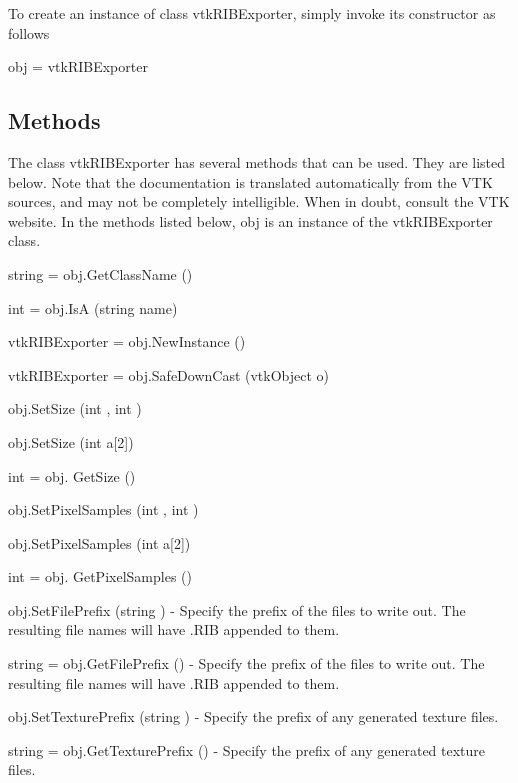 To create an instance of class vtk\-R\-I\-B\-Exporter, simply invoke its constructor as follows \begin{DoxyVerb}  obj = vtkRIBExporter
\end{DoxyVerb}
 \hypertarget{vtkwidgets_vtkxyplotwidget_Methods}{}\subsection{Methods}\label{vtkwidgets_vtkxyplotwidget_Methods}
The class vtk\-R\-I\-B\-Exporter has several methods that can be used. They are listed below. Note that the documentation is translated automatically from the V\-T\-K sources, and may not be completely intelligible. When in doubt, consult the V\-T\-K website. In the methods listed below, {\ttfamily obj} is an instance of the vtk\-R\-I\-B\-Exporter class. 
\begin{DoxyItemize}
\item {\ttfamily string = obj.\-Get\-Class\-Name ()}  
\item {\ttfamily int = obj.\-Is\-A (string name)}  
\item {\ttfamily vtk\-R\-I\-B\-Exporter = obj.\-New\-Instance ()}  
\item {\ttfamily vtk\-R\-I\-B\-Exporter = obj.\-Safe\-Down\-Cast (vtk\-Object o)}  
\item {\ttfamily obj.\-Set\-Size (int , int )}  
\item {\ttfamily obj.\-Set\-Size (int a\mbox{[}2\mbox{]})}  
\item {\ttfamily int = obj. Get\-Size ()}  
\item {\ttfamily obj.\-Set\-Pixel\-Samples (int , int )}  
\item {\ttfamily obj.\-Set\-Pixel\-Samples (int a\mbox{[}2\mbox{]})}  
\item {\ttfamily int = obj. Get\-Pixel\-Samples ()}  
\item {\ttfamily obj.\-Set\-File\-Prefix (string )} -\/ Specify the prefix of the files to write out. The resulting file names will have .R\-I\-B appended to them.  
\item {\ttfamily string = obj.\-Get\-File\-Prefix ()} -\/ Specify the prefix of the files to write out. The resulting file names will have .R\-I\-B appended to them.  
\item {\ttfamily obj.\-Set\-Texture\-Prefix (string )} -\/ Specify the prefix of any generated texture files.  
\item {\ttfamily string = obj.\-Get\-Texture\-Prefix ()} -\/ Specify the prefix of any generated texture files.  

\end{DoxyItemize}
